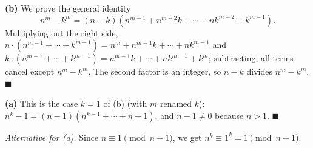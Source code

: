 \textbf{(b)} We prove the general identity
\[n^m-k^m=(n-k)\left(n^{m-1}+n^{m-2}k+\cdots+nk^{m-2}+k^{m-1}\right).\]
Multiplying out the right side, $n\cdot\left(n^{m-1}+\cdots+k^{m-1}\right)=n^m+n^{m-1}k+\cdots+nk^{m-1}$ and $k\cdot\left(n^{m-1}+\cdots+k^{m-1}\right)=n^{m-1}k+\cdots+nk^{m-1}+k^m$; subtracting, all terms cancel except $n^m-k^m$. The second factor is an integer, so $n-k$ divides $n^m-k^m$. $\blacksquare$

\textbf{(a)} This is the case $k=1$ of (b) (with $m$ renamed $k$): $n^k-1=(n-1)\left(n^{k-1}+\cdots+n+1\right)$, and $n-1\ne0$ because $n>1$. $\blacksquare$

\emph{Alternative for (a).} Since $n\equiv1\pmod{n-1}$, we get $n^k\equiv1^k=1\pmod{n-1}$.
